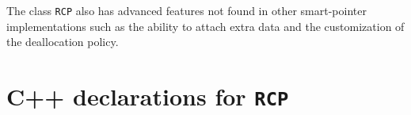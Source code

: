 \documentclass[pdf,ps2pdf,11pt]{SANDreport}
\begin{document}
The class {}\texttt{RCP} also has advanced features not
found in other smart-pointer implementations such as the ability to
attach extra data and the customization of the deallocation policy.

%
\clearpage



%

\appendix

%
\section{C++ declarations for {}\texttt{RCP}}
\label{rcpqs:apdx:c++decl}
%
\end{document}

